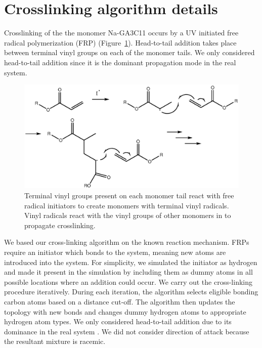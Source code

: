 \documentclass[journal=jpcbfk,manusciprt=article]{achemso}
\begin{document}
  \section{Crosslinking algorithm details}\label{section:xlink}

  Crosslinking of the the monomer Na-GA3C11 occurs by a UV initiated free
  radical polymerization (FRP) (Figure~\ref{fig:xlink_mech}). Head-to-tail addition
  takes place between terminal vinyl groups on each of the monomer tails. We
  only considered head-to-tail addition since it is the dominant propagation mode
  in the real system.   

  \begin{figure}[!htb]
  \centering
  \includegraphics[width=\textwidth]{Crosslink_mechanism.eps}
  \caption{Terminal vinyl groups present on each monomer tail react with free
	  radical initiators to create monomers with terminal vinyl radicals.  Vinyl
	  radicals react with the vinyl groups of other monomers in to propagate
	  crosslinking.}\label{fig:xlink_mech}
  \end{figure}
  
  We based our cross-linking algorithm on the known reaction mechanism.
  FRPs require an initiator which bonds to the system, meaning new atoms are
  introduced into the system. For simplicity, we simulated the initiator as
  hydrogen and made it present in the simulation by including them as dummy atoms
  in all possible locations where an addition could occur. We carry out the
  cross-linking procedure iteratively. During each iteration, the algorithm
  selects eligible bonding carbon atoms based on a distance cut-off. The algorithm
  then updates the topology with new bonds and changes dummy hydrogen atoms to appropriate
  hydrogen atom types. We only considered head-to-tail addition
  due to its dominance in the real system \cite{young_introduction_2011}. We did
  not consider direction of attack because the resultant mixture is racemic.
\end{document}
